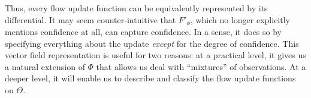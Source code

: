 Thus, every flow update function can be equivalently represented
by its differential.
% 
% 
It may seem counter-intuitive that $F'_\phi$,
which no longer explicitly mentions confidence at all,
can capture confidence. In a sense, it does so by specifying 
everything about the update \emph{except} for the degree of confidence.
This vector field representation is useful for two reasons: 
at a practical level, it gives us a natural extension of $\Phi$
that allows us deal with ``mixtures'' of observations.
At a deeper level, it will enable us to describe and classify
the flow update functions on $\Theta$.

